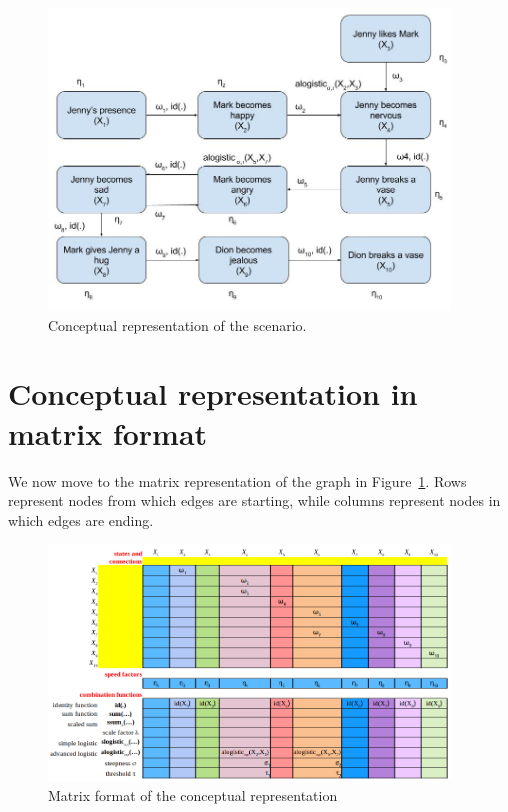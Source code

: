 \documentclass[a4paper]{article}
\begin{document}
\begin{figure}[!htbp]
\center
\includegraphics[width=0.95\textwidth]{res/img/graphical_conceptual_representation}
\caption{Conceptual representation of the scenario.}
\label{fig:graphical_conceptual_representation}
\end{figure}

\section{Conceptual representation in matrix format}

We now move to the matrix representation of the graph in Figure~\ref{fig:graphical_conceptual_representation}. Rows represent nodes from which edges are starting, while columns represent nodes in which edges are ending.

\begin{figure}[!htbp]
\centering
\includegraphics[width=0.95\textwidth]{res/img/matrix_conceptual_representation}
\caption{Matrix format of the conceptual representation}
\label{fig:matrix_conceptual_representation}
\end{figure}
\end{document}
